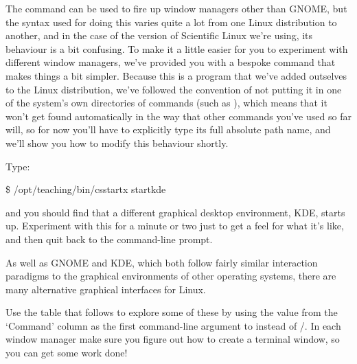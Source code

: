 The  command can be used to fire up window managers other than GNOME, but the syntax used for doing this varies quite a lot from one Linux distribution to another, and in the case of the version of Scientific Linux we're using, its behaviour is a bit confusing. To make it a little easier for you to experiment with different window managers, we've provided you with a bespoke command  that makes things a bit simpler. Because this is a program that we've added outselves to the Linux distribution, we've followed the convention of not putting it in one of the system's own directories of commands (such as ), which means that it won't get found automatically in the way that other commands you've used so far will, so for now you'll have to explicitly type its full absolute path name, and we'll show you how to modify this behaviour shortly. 

Type: 

\begin{ttoutenv}
\$ /opt/teaching/bin/csstartx startkde
\end{ttoutenv}

and you should find that a different graphical desktop environment, KDE, starts up. Experiment with this for a minute or two just to get a feel for what it's like, and then quit back to the command-line prompt.

As well as GNOME and KDE, which both follow fairly similar interaction paradigms to the graphical environments of other operating systems, there are many alternative graphical interfaces for Linux. 

Use the table that follows to explore some of these  by using the value from the `Command' column as the first command-line argument to  instead of /. In each window manager make sure you figure out how to create a terminal window, so you can get some work done!



